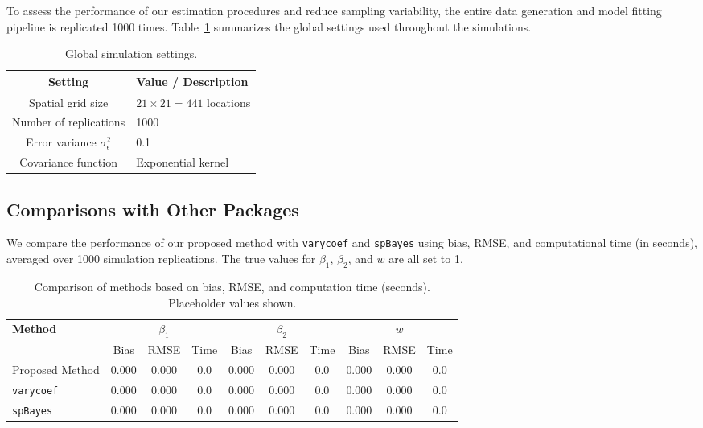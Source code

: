 To assess the performance of our estimation procedures and reduce sampling variability, the entire data generation and model fitting pipeline is replicated 1000 times. Table~\ref{tab:settings} summarizes the global settings used throughout the simulations.

\begin{table}[h!]
\centering
\caption{Global simulation settings.}
\label{tab:settings}
\begin{tabular}{|c|l|}
\hline
\textbf{Setting} & \textbf{Value / Description} \\
\hline
Spatial grid size & $ 21 \times 21 = 441 $ locations \\
Number of replications & 1000 \\
Error variance $ \sigma^2_\epsilon $ & 0.1 \\
Covariance function & Exponential kernel \\
\hline
\end{tabular}
\end{table}

\subsection{Comparisons with Other Packages}

We compare the performance of our proposed method with \texttt{varycoef} and \texttt{spBayes} using bias, RMSE, and computational time (in seconds), averaged over 1000 simulation replications. The true values for $ \beta_1 $, $ \beta_2 $, and $ w $ are all set to 1.

\begin{table}[h!]
\centering
\caption{Comparison of methods based on bias, RMSE, and computation time (seconds). Placeholder values shown.}
\label{tab:method-compact}
\begin{tabular}{|l|ccc|ccc|ccc|}
\hline
\textbf{Method} 
& \multicolumn{3}{c|}{ $ \beta_1 $ } 
& \multicolumn{3}{c|}{ $ \beta_2 $ } 
& \multicolumn{3}{c|}{ $ w $ } \\
\cline{2-10}
& Bias & RMSE & Time 
& Bias & RMSE & Time 
& Bias & RMSE & Time \\
\hline
Proposed Method 
& 0.000 & 0.000 & 0.0 
& 0.000 & 0.000 & 0.0 
& 0.000 & 0.000 & 0.0 \\
\texttt{varycoef} 
& 0.000 & 0.000 & 0.0 
& 0.000 & 0.000 & 0.0 
& 0.000 & 0.000 & 0.0 \\
\texttt{spBayes} 
& 0.000 & 0.000 & 0.0 
& 0.000 & 0.000 & 0.0 
& 0.000 & 0.000 & 0.0 \\
\hline
\end{tabular}
\end{table}

